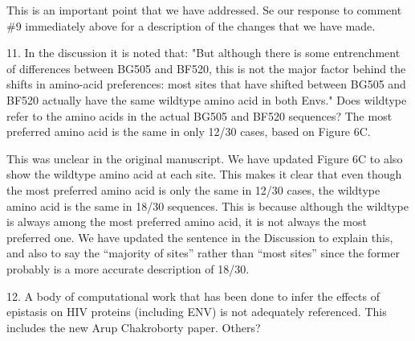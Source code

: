 \documentclass[11pt, oneside]{article}   	%
\begin{document}
{\color{black}
This is an important point that we have addressed.
Se our response to comment \#9 immediately above for a description of the changes that we have made.}

11. In the discussion it is noted that: "But although there is some entrenchment of differences between BG505 and BF520, this is not the major factor behind the shifts in amino-acid preferences: most sites that have shifted between BG505 and BF520 actually have the same wildtype amino acid in both Envs." Does wildtype refer to the amino acids in the actual BG505 and BF520 sequences? The most preferred amino acid is the same in only 12/30 cases, based on Figure 6C. 

{\color{black}
This was unclear in the original manuscript.
We have updated Figure 6C to also show the wildtype amino acid at each site.
This makes it clear that even though the most preferred amino acid is only the same in 12/30 cases, the wildtype amino acid is the same in 18/30 sequences.
This is because although the wildtype is always among the most preferred amino acid, it is not always the most preferred one.
We have updated the sentence in the Discussion to explain this, and also to say the ``majority of sites'' rather than ``most sites'' since the former probably is a more accurate description of 18/30.}

12. A body of computational work that has been done to infer the effects of epistasis on HIV proteins (including ENV) is not adequately referenced. 
{\color{red}
This includes the new Arup Chakroborty paper. Others?}
\end{document}
